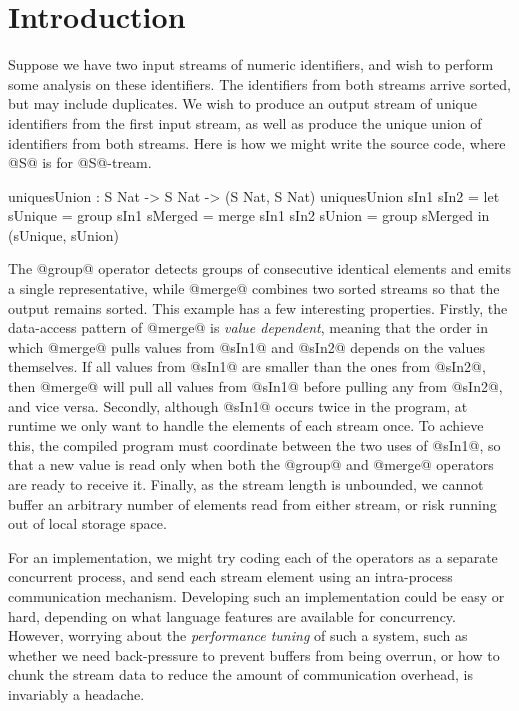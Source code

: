 \chapter{Introduction}
\label{s:Introduction}

Suppose we have two input streams of numeric identifiers, and wish to perform some analysis on these identifiers. The identifiers from both streams arrive sorted, but may include duplicates. We wish to produce an output stream of unique identifiers from the first input stream, as well as produce the unique union of identifiers from both streams. Here is how we might write the source code, where @S@ is for @S@-tream.
\begin{code}
  uniquesUnion : S Nat -> S Nat -> (S Nat, S Nat)
  uniquesUnion sIn1 sIn2
   = let  sUnique = group sIn1
          sMerged = merge sIn1 sIn2
          sUnion  = group sMerged
     in   (sUnique, sUnion)
\end{code}

The @group@ operator detects groups of consecutive identical elements and emits a single representative, while @merge@ combines two sorted streams so that the output remains sorted. This example has a few interesting properties. Firstly, the data-access pattern of @merge@ is \emph{value dependent}, meaning that the order in which @merge@ pulls values from @sIn1@ and @sIn2@ depends on the values themselves. If all values from @sIn1@ are smaller than the ones from @sIn2@, then @merge@ will pull all values from @sIn1@ before pulling any from @sIn2@, and vice versa. Secondly, although @sIn1@ occurs twice in the program, at runtime we only want to handle the elements of each stream once. To achieve this, the compiled program must coordinate between the two uses of @sIn1@, so that a new value is read only when both the @group@ and @merge@ operators are ready to receive it. Finally, as the stream length is unbounded, we cannot buffer an arbitrary number of elements read from either stream, or risk running out of local storage space.

For an implementation, we might try coding each of the operators as a separate concurrent process, and send each stream element using an intra-process communication mechanism. Developing such an implementation could be easy or hard, depending on what language features are available for concurrency. However, worrying about the \emph{performance tuning} of such a system, such as whether we need back-pressure to prevent buffers from being overrun, or how to chunk the stream data to reduce the amount of communication overhead, is invariably a headache. 

